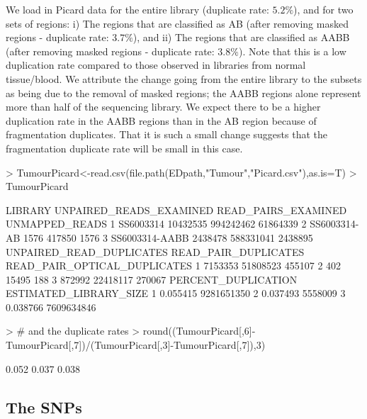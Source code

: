\documentclass{article}
\begin{document}
We load in Picard data for the entire library (duplicate rate: $5.2\%$), and for two sets of regions: i) The regions that are classified as AB (after removing masked regions - duplicate rate: $3.7\%$), and ii) The regions that are classified as AABB (after removing masked regions - duplicate rate: $3.8\%$). Note that this is a low duplication rate compared to those observed in libraries from normal tissue/blood. We attribute the change going from the entire library to the subsets as being due to the removal of masked regions; the AABB regions alone represent more than half of the sequencing library. We expect there to be a higher duplication rate in the AABB regions than in the AB region because of fragmentation duplicates. That it is such a small change suggests that the fragmentation duplicate rate will be small in this case.

\begin{Schunk}
\begin{Sinput}
> TumourPicard<-read.csv(file.path(EDpath,"Tumour","Picard.csv"),as.is=T)
> TumourPicard
\end{Sinput}
\begin{Soutput}
         LIBRARY UNPAIRED_READS_EXAMINED READ_PAIRS_EXAMINED UNMAPPED_READS
1      SS6003314                10432535           994242462       61864339
2   SS6003314-AB                    1576              417850           1576
3 SS6003314-AABB                 2438478           588331041        2438895
  UNPAIRED_READ_DUPLICATES READ_PAIR_DUPLICATES READ_PAIR_OPTICAL_DUPLICATES
1                  7153353             51808523                       455107
2                      402                15495                          188
3                   872992             22418117                       270067
  PERCENT_DUPLICATION ESTIMATED_LIBRARY_SIZE
1            0.055415             9281651350
2            0.037493                5558009
3            0.038766             7609634846
\end{Soutput}
\begin{Sinput}
> # and the duplicate rates
> round((TumourPicard[,6]-TumourPicard[,7])/(TumourPicard[,3]-TumourPicard[,7]),3)
\end{Sinput}
\begin{Soutput}
[1] 0.052 0.037 0.038
\end{Soutput}
\end{Schunk}

\subsection{The SNPs}
\end{document}
